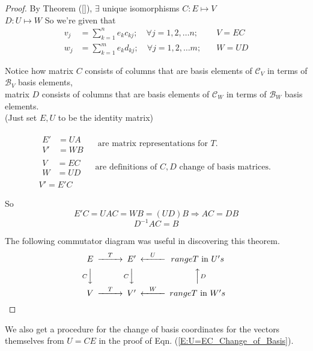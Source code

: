\documentclass[twoside]{amsart}
\theoremstyle{plain}
\theoremstyle{definition}
\begin{document}
\begin{proof}
By Theorem (\ref{}), $\exists$ unique isomorphisms $C:E\mapsto V$  \\
\phantom{By Theorem (3.00), $\exists$ unique isomorphisms} $D:U\mapsto W$  
So we're given that 
\begin{align*}
v_j & = \sum_{k=1}^n e_k c_{kj}; \quad \forall j = 1,2,\dots n; \quad & V = EC \\
w_j & = \sum_{k=1}^m e_k d_{kj}; \quad \forall j = 1,2,\dots m; \quad & W = UD 
\end{align*}

Notice how matrix $C$ consists of columns that are basis elements of $\mathcal{C}_V$ in terms of $\mathcal{B}_V$ basis elements, \\
\phantom{Notice how} matrix $D$ consists of columns that are basis elements of $\mathcal{C}_W$ in terms of $\mathcal{B}_W$ basis elements.\\
(Just set $E,U$ to be the identity matrix)

\begin{gather*}
\begin{aligned}
E' &= UA \\
V' &=  WB
\end{aligned}
\quad \text{ are matrix representations for $T$. } \\ 
 \begin{aligned}
V &= EC \\
W &= UD 
\end{aligned}
\quad \text{ are definitions of $C,D$ change of basis matrices.  } \\ 
 V'=E'C
\end{gather*}

So
\[
E'C = UAC = WB = (UD) B \Longrightarrow AC = DB
\]
\[
\boxed{ D^{-1}AC = B}
\]

The following commutator diagram was useful in discovering this theorem.  
\[
\begin{CD}
  E @>T>> E' @<U<< range T \text{ in } U's \\
@VCVV @VCVV @AADA \\
V @>T>> V' @<W<< range T \text{ in } W's
\end{CD}
\]
\end{proof}

We also get a procedure for the change of basis coordinates for the vectors themselves from $U=CE$ in the proof of Eqn. (\ref{E:U=EC_Change_of_Basis}).
\end{document}
